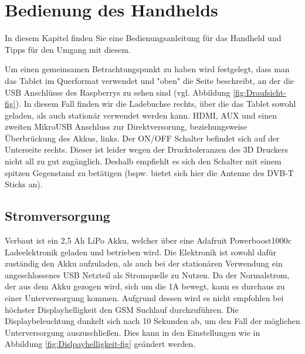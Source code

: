 %
%

\chapter{Bedienung des Handhelds}
In diesem Kapitel finden Sie eine Bedienungsanleitung für das Handheld und Tipps für den Umgang mit diesem.

Um einen gemeinsamen Betrachtungspunkt zu haben wird festgelegt, dass man das Tablet im Querformat verwendet und "oben" die Seite beschreibt, an der die USB Anschlüsse des Raspberrys zu sehen sind (vgl. Abbildung \ref{fig:Draufsicht-fig}). In diesem Fall finden wir die Ladebuchse rechts, über die das Tablet sowohl geladen, als auch stationär verwendet werden kann. HDMI, AUX und einen zweiten MikroUSB Anschluss zur Direktversorung, beziehungsweise Überbrückung des Akkus, links. Der ON/OFF Schalter befindet sich auf der Unterseite rechts. Dieser ist leider wegen der Drucktoleranzen des 3D Druckers nicht all zu gut zugänglich. Deshalb empfiehlt es sich den Schalter mit einem spitzen Gegenstand zu betätigen (bspw. bietet sich hier die Antenne des DVB-T Sticks an).

\newpage

\section{Stromversorgung}

Verbaut ist ein 2,5 Ah LiPo Akku, welcher über eine Adafruit Powerboost1000c Ladeelektronik geladen und betrieben wird. Die Elektronik ist sowohl dafür zuständig den Akku aufzuladen, als auch bei der stationären Verwendung ein angeschlossenes USB Netzteil als Stromquelle zu Nutzen. Da der Normalstrom, der aus dem Akku gezogen wird, sich um die 1A bewegt, kann es durchaus zu einer Unterversorgung kommen. Aufgrund dessen wird es nicht empfohlen bei höchster Displayhelligkeit den \ac{GSM} Suchlauf durchzuführen. Die Displaybeleuchtung dunkelt sich nach 10 Sekunden ab, um den Fall der möglichen Unterversorgung auszuschließen. Dies kann in den Einstellungen wie in Abbildung \ref{fig:Dislpayhelligkeit-fig} geändert werden. 



